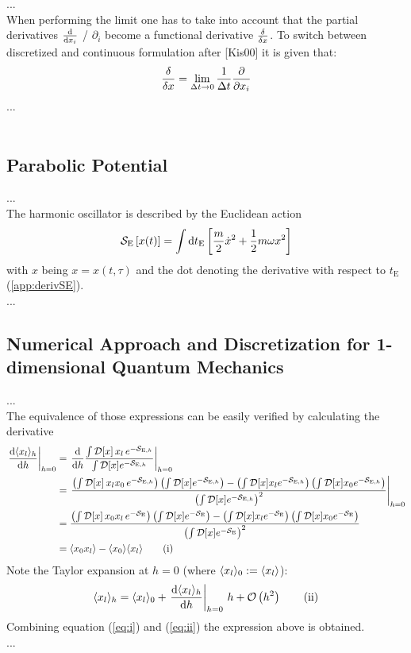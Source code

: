 ...\\
When performing the limit one has to take into account that the partial derivatives $\dv{x_i}$ / $\partial_i$  become a functional derivative $\fdv{x}$. To switch between discretized and continuous formulation after [Kis00] it is given that:
\begin{equation}
    \fdv{x} = \lim\limits_{\Delta t \to 0} \OverDeltaT{1} \pdv{x_i}
\end{equation}
...\\
\\
\subsection{Parabolic Potential}

...\\
The harmonic oscillator is described by the Euclidean action
\begin{align}
    \mathcal{S}_\mathrm{E}\left[x(t)\right] = \int\dd{t_\mathrm{E}}\left[\frac{m}{2}\dot{x}^2 + \frac{1}{2} m \omega x^2\right]
\end{align}
with $x$ being $x = x(t, \tau )$ and the dot denoting the derivative with respect to $t_\mathrm{E}$ (\ref{app:derivSE}).\\
...

\subsection{Numerical Approach and Discretization
for 1-dimensional Quantum Mechanics}
...\\
The equivalence of those expressions can be easily verified by calculating the derivative\\
\begin{align*}
    \eval{\dv{\avg{x_l}_h}{h}}_{h=0} &=
    \eval{\dv{h}\frac{\pathinth{\,x_l\,}}{\pathinth{}}}_{h=0} \\ &=
    \eval{\frac{\left(\pathinth{\,x_l x_0\,}\right)\left(\pathinth{}\right)
    -\left(\pathinth{x_l}\right)\left(\pathinth{x_0}\right)}
    {\left(\pathinth{}\right)^2}}_{h=0} \\ &=
    \frac{\left(\pathint{\,x_0 x_l\,}\right)\left(\pathint{}\right)
    -\left(\pathint{x_l}\right)\left(\pathint{x_0}\right)}
    {\left(\pathint{}\right)^2} \\ &=
    \avg{x_0 x_l}-\avg{x_0}\avg{x_l} \tag{i}\label{eq:i}
\end{align*}
Note the Taylor expansion at $h=0$ (where $\langle x_l\rangle_0:=\langle x_l\rangle$):
\begin{equation*}
    \avg{x_l}_h=\avg{x_l}_0+\eval{\dv{\avg{x_l}_h}{h}}_{h=0}\,h+\BigO{h^2}
    \tag{ii}\label{eq:ii}
\end{equation*}
Combining equation (\ref{eq:i}) and (\ref{eq:ii}) the expression above is obtained.\\
...\\

